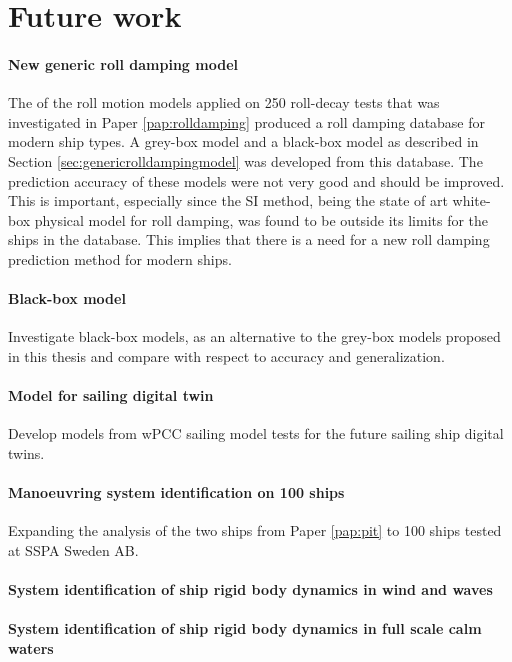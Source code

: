 \chapter{Future work\label{ch:future_work}}

\subsubsection*{New generic roll damping model}
The  of the roll motion models applied on 250 roll-decay tests that was investigated in Paper \ref{pap:rolldamping} produced a roll damping database for modern ship types. A grey-box model and a black-box model as described in Section \ref{sec:genericrolldampingmodel} was developed from this database. The prediction accuracy of these models were not very good and should be improved. This is important, especially since the SI method, being the state of art white-box physical model for roll damping, was found to be outside its limits for the ships in the database. This implies that there is a need for a new roll damping prediction method for modern ships.  

\subsubsection*{Black-box model}
Investigate black-box models, as an alternative to the grey-box models proposed in this thesis and compare with respect to accuracy and generalization.

\subsubsection*{Model for sailing digital twin}
Develop models from wPCC sailing model tests for the future sailing ship digital twins.

\subsubsection*{Manoeuvring system identification on 100 ships}
Expanding the analysis of the two ships from Paper \ref{pap:pit} to 100 ships tested at SSPA Sweden AB.

\subsubsection*{System identification of ship rigid body dynamics in wind and waves}

\subsubsection*{System identification of ship rigid body dynamics in full scale calm waters}
